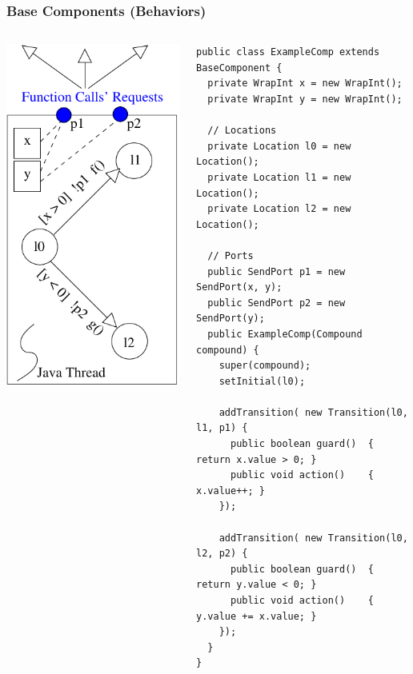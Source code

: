 \documentclass[compress,xcolor=dvipsnames,10pt]{beamer}
\begin{document}
\graphicspath{{figs/}}



\begin{frame}[fragile]
\frametitle{Base Components (Behaviors)}
\begin{columns}
 \begin{column}{0.4\linewidth}
 \begin{center}
 \includegraphics[scale=0.5]{figs/basecomponent.pdf}
\end{center}
  \end{column}
   \begin{column}{0.55\linewidth}
   \begin{lstlisting}[style=customjava, basicstyle=\ttfamily\tiny]
public class ExampleComp extends BaseComponent {
  private WrapInt x = new WrapInt();
  private WrapInt y = new WrapInt();
  
  // Locations
  private Location l0 = new Location();
  private Location l1 = new Location();
  private Location l2 = new Location();
   
  // Ports
  public SendPort p1 = new SendPort(x, y);
  public SendPort p2 = new SendPort(y);
  public ExampleComp(Compound compound) {
    super(compound);
    setInitial(l0);
    
    addTransition( new Transition(l0, l1, p1) {
      public boolean guard()  { return x.value > 0; }
      public void action()    { x.value++; }
    });
     
    addTransition( new Transition(l0, l2, p2) {
      public boolean guard()  { return y.value < 0; }
      public void action()    { y.value += x.value; }
    });
  }
}
\end{lstlisting}
  \end{column}
 \end{columns}
\end{frame}
\end{document}
